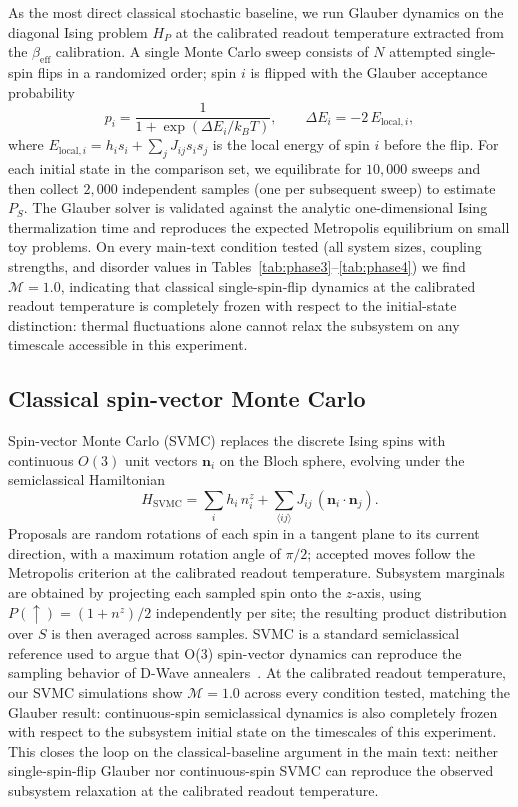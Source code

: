 \documentclass[aps,prapplied,reprint,superscriptaddress,floatfix,nofootinbib]{revtex4-2}
\begin{document}
As the most direct classical stochastic baseline, we run Glauber dynamics on the diagonal Ising problem $H_P$ at the calibrated readout temperature extracted from the $\beta_\mathrm{eff}$ calibration.
A single Monte Carlo sweep consists of $N$ attempted single-spin flips in a randomized order; spin $i$ is flipped with the Glauber acceptance probability
\begin{equation}
p_i = \frac{1}{1 + \exp(\Delta E_i / k_B T)}, \qquad \Delta E_i = -2\,E_{\text{local},i},
\end{equation}
where $E_{\text{local},i} = h_i s_i + \sum_{j} J_{ij} s_i s_j$ is the local energy of spin $i$ before the flip.
For each initial state in the comparison set, we equilibrate for $10{,}000$ sweeps and then collect $2{,}000$ independent samples (one per subsequent sweep) to estimate $P_S$.
The Glauber solver is validated against the analytic one-dimensional Ising thermalization time and reproduces the expected Metropolis equilibrium on small toy problems.
On every main-text condition tested (all system sizes, coupling strengths, and disorder values in Tables~\ref{tab:phase3}--\ref{tab:phase4}) we find $\mathcal{M} = 1.0$, indicating that classical single-spin-flip dynamics at the calibrated readout temperature is completely frozen with respect to the initial-state distinction: thermal fluctuations alone cannot relax the subsystem on any timescale accessible in this experiment.

\subsection{Classical spin-vector Monte Carlo}
\label{sec:svmc}

Spin-vector Monte Carlo (SVMC) replaces the discrete Ising spins with continuous $O(3)$ unit vectors $\mathbf{n}_i$ on the Bloch sphere, evolving under the semiclassical Hamiltonian
\begin{equation}
H_\text{SVMC} = \sum_i h_i\,n_i^z + \sum_{\langle ij \rangle} J_{ij}\,(\mathbf{n}_i \cdot \mathbf{n}_j).
\end{equation}
Proposals are random rotations of each spin in a tangent plane to its current direction, with a maximum rotation angle of $\pi/2$; accepted moves follow the Metropolis criterion at the calibrated readout temperature.
Subsystem marginals are obtained by projecting each sampled spin onto the $z$-axis, using $P(\uparrow) = (1 + n^z)/2$ independently per site; the resulting product distribution over $S$ is then averaged across samples.
SVMC is a standard semiclassical reference used to argue that O(3) spin-vector dynamics can reproduce the sampling behavior of D-Wave annealers~\cite{shin2014svmc}.
At the calibrated readout temperature, our SVMC simulations show $\mathcal{M}=1.0$ across every condition tested, matching the Glauber result: continuous-spin semiclassical dynamics is also completely frozen with respect to the subsystem initial state on the timescales of this experiment.
This closes the loop on the classical-baseline argument in the main text: neither single-spin-flip Glauber nor continuous-spin SVMC can reproduce the observed subsystem relaxation at the calibrated readout temperature.
\end{document}

